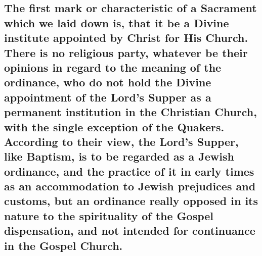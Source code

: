 \documentclass[]{book}
\begin{document}
\hypertarget{the-first-mark-or-characteristic-of-a-sacrament-which-we-laid-down-is-that-it-be-a-divine-institute-appointed-by-christ-for-his-church.-there-is-no-religious-party-whatever-be-their-opinions-in-regard-to-the-meaning-of-the-ordinance-who-do-not-hold-the-divine-appointment-of-the-lords-supper-as-a-permanent-institution-in-the-christian-church-with-the-single-exception-of-the-quakers.-according-to-their-view-the-lords-supper-like-baptism-is-to-be-regarded-as-a-jewish-ordinance-and-the-practice-of-it-in-early-times-as-an-accommodation-to-jewish-prejudices-and-customs-but-an-ordinance-really-opposed-in-its-nature-to-the-spirituality-of-the-gospel-dispensation-and-not-intended-for-continuance-in-the-gospel-church.}{%
\subsection{The first mark or characteristic of a Sacrament which we laid down is, that it be a Divine institute appointed by Christ for His Church. There is no religious party, whatever be their opinions in regard to the meaning of the ordinance, who do not hold the Divine appointment of the Lord's Supper as a permanent institution in the Christian Church, with the single exception of the Quakers. According to their view, the Lord's Supper, like Baptism, is to be regarded as a Jewish ordinance, and the practice of it in early times as an accommodation to Jewish prejudices and customs, but an ordinance really opposed in its nature to the spirituality of the Gospel dispensation, and not intended for continuance in the Gospel Church.}\label{the-first-mark-or-characteristic-of-a-sacrament-which-we-laid-down-is-that-it-be-a-divine-institute-appointed-by-christ-for-his-church.-there-is-no-religious-party-whatever-be-their-opinions-in-regard-to-the-meaning-of-the-ordinance-who-do-not-hold-the-divine-appointment-of-the-lords-supper-as-a-permanent-institution-in-the-christian-church-with-the-single-exception-of-the-quakers.-according-to-their-view-the-lords-supper-like-baptism-is-to-be-regarded-as-a-jewish-ordinance-and-the-practice-of-it-in-early-times-as-an-accommodation-to-jewish-prejudices-and-customs-but-an-ordinance-really-opposed-in-its-nature-to-the-spirituality-of-the-gospel-dispensation-and-not-intended-for-continuance-in-the-gospel-church.}}
\end{document}
